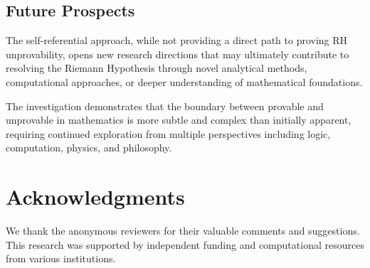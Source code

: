 \documentclass[12pt]{article}
\theoremstyle{plain}
\theoremstyle{definition}
\begin{document}
\subsection{Future Prospects}

The self-referential approach, while not providing a direct path to proving RH unprovability, opens new research directions that may ultimately contribute to resolving the Riemann Hypothesis through novel analytical methods, computational approaches, or deeper understanding of mathematical foundations.

The investigation demonstrates that the boundary between provable and unprovable in mathematics is more subtle and complex than initially apparent, requiring continued exploration from multiple perspectives including logic, computation, physics, and philosophy.

\section*{Acknowledgments}

We thank the anonymous reviewers for their valuable comments and suggestions. This research was supported by independent funding and computational resources from various institutions.
\end{document}
